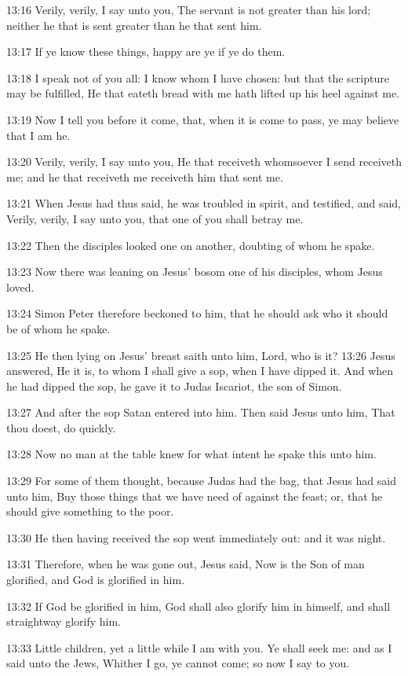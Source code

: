 13:16 Verily, verily, I say unto you, The servant is not greater than his lord; neither he that is sent greater than he that sent him.

13:17 If ye know these things, happy are ye if ye do them.

13:18 I speak not of you all: I know whom I have chosen: but that the scripture may be fulfilled, He that eateth bread with me hath lifted up his heel against me.

13:19 Now I tell you before it come, that, when it is come to pass, ye may believe that I am he.

13:20 Verily, verily, I say unto you, He that receiveth whomsoever I send receiveth me; and he that receiveth me receiveth him that sent me.

13:21 When Jesus had thus said, he was troubled in spirit, and testified, and said, Verily, verily, I say unto you, that one of you shall betray me.

13:22 Then the disciples looked one on another, doubting of whom he spake.

13:23 Now there was leaning on Jesus' bosom one of his disciples, whom Jesus loved.

13:24 Simon Peter therefore beckoned to him, that he should ask who it should be of whom he spake.

13:25 He then lying on Jesus' breast saith unto him, Lord, who is it?  13:26 Jesus answered, He it is, to whom I shall give a sop, when I have dipped it. And when he had dipped the sop, he gave it to Judas Iscariot, the son of Simon.

13:27 And after the sop Satan entered into him. Then said Jesus unto him, That thou doest, do quickly.

13:28 Now no man at the table knew for what intent he spake this unto him.

13:29 For some of them thought, because Judas had the bag, that Jesus had said unto him, Buy those things that we have need of against the feast; or, that he should give something to the poor.

13:30 He then having received the sop went immediately out: and it was night.

13:31 Therefore, when he was gone out, Jesus said, Now is the Son of man glorified, and God is glorified in him.

13:32 If God be glorified in him, God shall also glorify him in himself, and shall straightway glorify him.

13:33 Little children, yet a little while I am with you. Ye shall seek me: and as I said unto the Jews, Whither I go, ye cannot come; so now I say to you.

